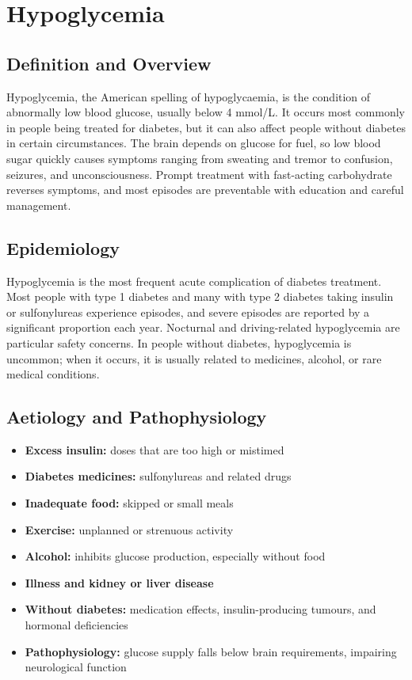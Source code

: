 \chapter{Hypoglycemia}

\section*{Definition and Overview}
Hypoglycemia, the American spelling of hypoglycaemia, is the condition of abnormally low blood glucose, usually below 4 mmol/L. It occurs most commonly in people being treated for diabetes, but it can also affect people without diabetes in certain circumstances. The brain depends on glucose for fuel, so low blood sugar quickly causes symptoms ranging from sweating and tremor to confusion, seizures, and unconsciousness. Prompt treatment with fast-acting carbohydrate reverses symptoms, and most episodes are preventable with education and careful management.

\section*{Epidemiology}
Hypoglycemia is the most frequent acute complication of diabetes treatment. Most people with type 1 diabetes and many with type 2 diabetes taking insulin or sulfonylureas experience episodes, and severe episodes are reported by a significant proportion each year. Nocturnal and driving-related hypoglycemia are particular safety concerns. In people without diabetes, hypoglycemia is uncommon; when it occurs, it is usually related to medicines, alcohol, or rare medical conditions.

\section*{Aetiology and Pathophysiology}
\begin{itemize}
    \item \textbf{Excess insulin:} doses that are too high or mistimed
    \item \textbf{Diabetes medicines:} sulfonylureas and related drugs
    \item \textbf{Inadequate food:} skipped or small meals
    \item \textbf{Exercise:} unplanned or strenuous activity
    \item \textbf{Alcohol:} inhibits glucose production, especially without food
    \item \textbf{Illness and kidney or liver disease}
    \item \textbf{Without diabetes:} medication effects, insulin-producing tumours, and hormonal deficiencies
    \item \textbf{Pathophysiology:} glucose supply falls below brain requirements, impairing neurological function
\end{itemize}

